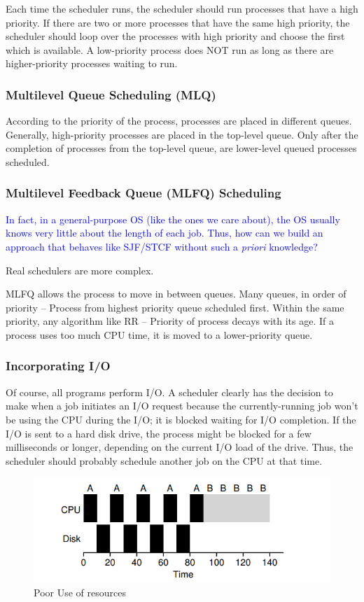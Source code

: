 \documentclass{article}
\begin{document}
Each time the scheduler runs, the scheduler should run processes that have a high priority. If there are two or more processes that have the same high priority, the scheduler should loop over the processes with high priority and choose the first which is available. A low-priority process does NOT run as long as there are higher-priority processes waiting to run.

\subsubsection{Multilevel Queue Scheduling (MLQ)}
According to the priority of the process, processes are placed in different queues. Generally, high-priority processes are placed in the top-level queue. Only after the completion of processes from the top-level queue, are lower-level queued processes scheduled.

\subsubsection{Multilevel Feedback Queue (MLFQ) Scheduling}
\textcolor{blue}{ In fact, in a general-purpose OS (like the ones we care about), the OS usually knows very little about the length of each job. Thus, how can we build an approach that behaves like SJF/STCF without such a \textit{priori} knowledge?}

Real schedulers are more complex.

MLFQ allows the process to move in between queues. Many queues, in order of priority – Process from highest priority queue scheduled first. Within the same priority, any algorithm like RR – Priority of process decays with its age. If a process uses too much CPU time, it is moved to a lower-priority queue.

\subsubsection{Incorporating I/O}
Of course, all programs perform I/O. A scheduler clearly has the decision to make when a job initiates an I/O request because the currently-running job won't be using the CPU during the I/O; it is blocked waiting for I/O completion. If the I/O is sent to a hard disk drive, the process might be blocked for a few milliseconds or longer, depending on the current I/O load of the drive. Thus, the scheduler should probably schedule another job on the CPU at that time.\\

\begin{figure}[H]
        \centering
        \includegraphics[width=0.6\linewidth]{image/io1.png}
        \caption{Poor Use of resources}
\end{figure}
\end{document}
